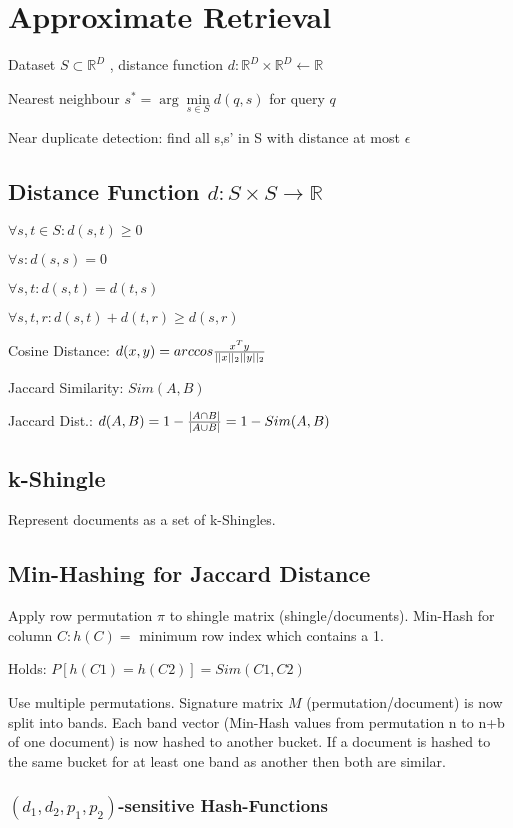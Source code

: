 \documentclass[a4paper,11pt,twocolumn]{article}
\author{Matthias Ganz}
\begin{document}
\section{Approximate Retrieval}
Dataset $S \subset \mathbb{R}^D$ , distance function $d: \mathbb{R}^D \times \mathbb{R}^D \leftarrow \mathbb{R}$

Nearest neighbour $s^* = \arg\min \limits_{s \in S} d(q,s) $ for query $q$

Near duplicate detection: find all s,s' in S with distance at most $\epsilon$

\subsection{Distance Function $d: S \times S  \rightarrow \mathbb{R}$}

$\forall s,t \in S : d(s,t) \geq 0$

$\forall s: d(s,s) = 0$

$\forall s,t:d(s,t) = d(t,s)$

$\forall s,t,r : d(s,t) + d(t,r) \geq d(s,r)$

Cosine Distance: $d(x,y) = arccos  {{x^T y}\over{ ||x||_2 ||y||_2}} $

Jaccard Similarity: $Sim(A,B)$

Jaccard Dist.: $d(A,B) = 1 - {{|A \cap B|}\over{|A \cup B|}} = 1 - Sim(A,B) $

\subsection{k-Shingle}
Represent documents as a set of k-Shingles.

\subsection{Min-Hashing for Jaccard Distance}
Apply row permutation $\pi$ to shingle matrix (shingle/documents). Min-Hash for column $C: h(C) =$ minimum row index which contains a 1.

Holds: $P[h(C1) = h(C2)] = Sim (C1,C2)$

Use multiple permutations. Signature matrix $M$ (permutation/document) is now split into bands. Each band vector (Min-Hash values from permutation n to n+b of one document) is now hashed to another bucket. If a document is hashed to the same bucket for at least one band as another then both are similar.


\subsubsection{$(d_1,d_2,p_1,p_2)$-sensitive Hash-Functions}
\end{document}
